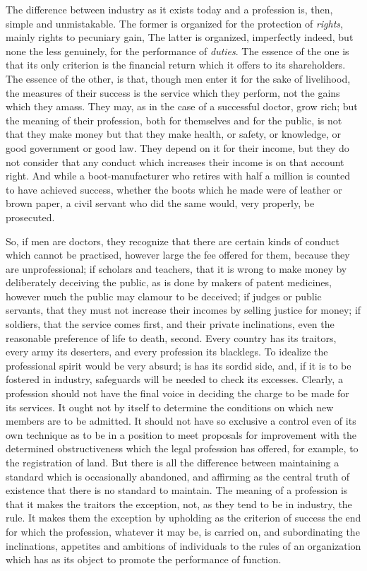 \documentclass{book}
\begin{document}
The difference between industry as it exists today and a profession is, then, simple and unmistakable. The former is organized for the protection of \emph{rights}, mainly rights to pecuniary gain, The latter is organized, imperfectly indeed, but none the less genuinely, for the performance of \emph{duties}. The essence of the one is that its only criterion is the financial return which it offers to its shareholders. The essence of the other, is that, though men enter it for the sake of livelihood, the measures of their success is the service which they perform, not the gains which they amass. They may, as in the case of a successful doctor, grow rich; but the meaning of their profession, both for themselves and for the public, is not that they make money but that they make health, or safety, or knowledge, or good government or good law. They depend on it for their income, but they do not consider that any conduct which increases their income is on that account right. And while a boot-manufacturer who retires with half a million is counted to have achieved success, whether the boots which he made were of leather or brown paper, a civil servant who did the same would, very properly, be prosecuted.

So, if men are doctors, they recognize that there are certain kinds of conduct which cannot be practised, however large the fee offered for them, because they are unprofessional; if scholars and teachers, that it is wrong to make money by deliberately deceiving the public, as is done by makers of patent medicines, however much the public may clamour to be deceived; if judges or public servants, that they must not increase their incomes by selling justice for money; if soldiers, that the service comes first, and their private inclinations, even the reasonable preference of life to death, second. Every country has its traitors, every army its deserters, and every profession its blacklegs. To idealize the professional spirit would be very absurd; is has its sordid side, and, if it is to be fostered in industry, safeguards will be needed to check its excesses. Clearly, a profession should not have the final voice in deciding the charge to be made for its services. It ought not by itself to determine the conditions on which new members are to be admitted. It should not have so exclusive a control even of its own technique as to be in a position to meet proposals for improvement with the determined obstructiveness which the legal profession has offered, for example, to the registration of land. But there is all the difference between maintaining a standard which is occasionally abandoned, and affirming as the central truth of existence that there is no standard to maintain. The meaning of a profession is that it makes the traitors the exception, not, as they tend to be in industry, the rule. It makes them the exception by upholding as the criterion of success the end for which the profession, whatever it may be, is carried on, and subordinating the inclinations, appetites and ambitions of individuals to the rules of an organization which has as its object to promote the performance of function.
\end{document}
